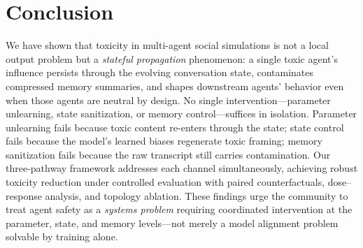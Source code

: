 \section{Conclusion}
\label{sec:conclusion}

We have shown that toxicity in multi-agent social simulations is not a local output problem but a \emph{stateful propagation} phenomenon: a single toxic agent's influence persists through the evolving conversation state, contaminates compressed memory summaries, and shapes downstream agents' behavior even when those agents are neutral by design.
No single intervention---parameter unlearning, state sanitization, or memory control---suffices in isolation.
Parameter unlearning fails because toxic content re-enters through the state; state control fails because the model's learned biases regenerate toxic framing; memory sanitization fails because the raw transcript still carries contamination.
Our three-pathway framework addresses each channel simultaneously, achieving robust toxicity reduction under controlled evaluation with paired counterfactuals, dose--response analysis, and topology ablation.
These findings urge the community to treat agent safety as a \emph{systems problem} requiring coordinated intervention at the parameter, state, and memory levels---not merely a model alignment problem solvable by training alone.
